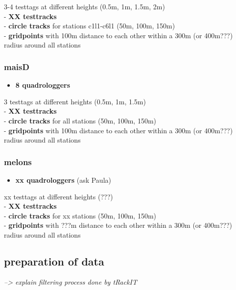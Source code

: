 \documentclass[
  letterpaper,
  DIV=11,
  numbers=noendperiod]{scrartcl}
\providecommand{\tightlist}{%
  \setlength{\itemsep}{0pt}\setlength{\parskip}{0pt}}\usepackage{longtable,booktabs,array}
\begin{document}
3-4 testtags at different heights (0.5m, 1m, 1.5m, 2m)\\
- \textbf{XX testtracks}\\
- \textbf{circle tracks} for stations c1l1-c6l1 (50m, 100m, 150m)\\
- \textbf{gridpoints} with 100m distance to each other within a 300m (or
400m???) radius around all stations

\hypertarget{maisd}{%
\subsubsection{maisD}\label{maisd}}

\begin{itemize}
\tightlist
\item
  \textbf{8 quadrologgers}
\end{itemize}

3 testtags at different heights (0.5m, 1m, 1.5m)\\
- \textbf{XX testtracks}\\
- \textbf{circle tracks} for all stations (50m, 100m, 150m)\\
- \textbf{gridpoints} with 100m distance to each other within a 300m (or
400m???) radius around all stations

\hypertarget{melons}{%
\subsubsection{melons}\label{melons}}

\begin{itemize}
\tightlist
\item
  \textbf{xx quadrologgers} (ask Paula)
\end{itemize}

xx testtags at different heights (???)\\
- \textbf{XX testtracks}\\
- \textbf{circle tracks} for xx stations (50m, 100m, 150m)\\
- \textbf{gridpoints} with ???m distance to each other within a 300m (or
400m???) radius around all stations

\hypertarget{preparation-of-data}{%
\subsection{preparation of data}\label{preparation-of-data}}

\emph{--\textgreater{} explain filtering process done by tRackIT}
\end{document}
